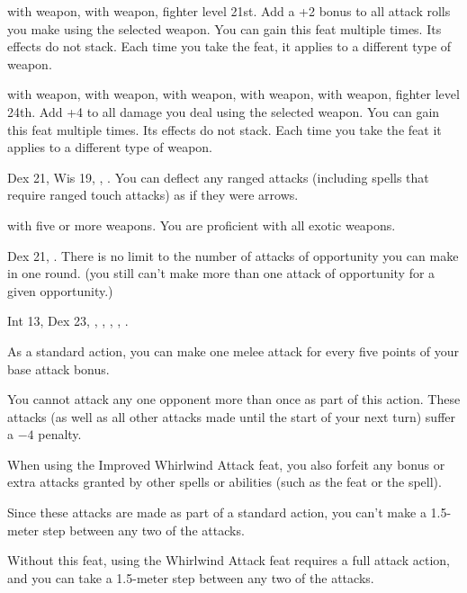 {}
{ with weapon,  with weapon, fighter level 21st.}
{Add a +2 bonus to all attack rolls you make using the selected weapon.}
{}{You can gain this feat multiple times. Its effects do not stack. Each time you take the feat, it applies to a different type of weapon.}

{}
{ with weapon,  with weapon,  with weapon,  with weapon,  with weapon, fighter level 24th.}
{Add +4 to all damage you deal using the selected weapon.}
{}{You can gain this feat multiple times. Its effects do not stack. Each time you take the feat it applies to a different type of weapon.}

{Dex 21, Wis 19, , .}
{You can deflect any ranged attacks (including spells that require ranged touch attacks) as if they were arrows.}

{ with five or more weapons.}
{You are proficient with all exotic weapons.}

{Dex 21, .}
{There is no limit to the number of attacks of opportunity you can make in one round. (you still can't make more than one attack of opportunity for a given opportunity.)}

{}
{Int 13, Dex 23, , , , , .}
{As a standard action, you can make one melee attack for every five points of your base attack bonus.

You cannot attack any one opponent more than once as part of this action. These attacks (as well as all other attacks made until the start of your next turn) suffer a $-4$ penalty.

When using the Improved Whirlwind Attack feat, you also forfeit any bonus or extra attacks granted by other spells or abilities (such as the  feat or the  spell).

Since these attacks are made as part of a standard action, you can't make a 1.5-meter step between any two of the attacks.}
{Without this feat, using the Whirlwind Attack feat requires a full attack action, and you can take a 1.5-meter step between any two of the attacks.}
{}

